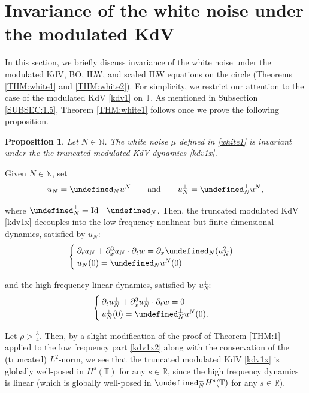 \documentclass[letterpaper, 11pt,  reqno]{amsart}
\newtheorem{proposition}[theorem]{Proposition}
\DeclareMathOperator{\Id}{Id}
\newcommand{\1}{\hspace{0.5mm}\text{I}\hspace{0.5mm}}
\newcommand{\noi}{\noindent}
\newcommand{\R}{\mathbb{R}}
\newcommand{\T}{\mathbb{T}}
\let\P= \undefined
\newcommand{\P}{\mathbf{P}}
\newcommand{\dx}{\partial_x}
\newcommand{\dt}{\partial_t}
\newcommand{\N}{\mathbb{N}}
\numberwithin{equation}{section}
\numberwithin{theorem}{section}
\begin{document}
\section{Invariance of the white noise under the modulated KdV}
\label{SEC:WN}



In this section, we briefly discuss 
invariance of the white noise under
the modulated KdV, BO, ILW, and scaled ILW equations on the circle
(Theorems \ref{THM:white1} and \ref{THM:white2}).
For simplicity, we restrict our attention to the case
of the modulated KdV \eqref{kdv1} on $\T$.
As mentioned in Subsection \ref{SUBSEC:1.5}, 
Theorem \ref{THM:white1} follows once we prove the following proposition.


\begin{proposition}\label{PROP:white2}
Let $N \in \N$. The white noise $\mu$ defined in \eqref{white1}
is invariant under the 
the truncated modulated KdV dynamics \eqref{kdv1x}.
\end{proposition}





Given $N \in \N$, 
set
\begin{align*}
u_N = \P_N u^N\qquad \text{and}\qquad
u_N^\perp = \P_N^\perp u^N, 
\end{align*}

\noi
where  $\P_N^\perp = \Id - \P_N$.
Then, the truncated modulated KdV \eqref{kdv1x}
decouples into the low frequency nonlinear but finite-dimensional dynamics, 
satisfied by $u_N$:
\begin{equation}
\begin{cases}
\dt u_N+  \dx^3 u_N \cdot \dt w =\dx \P_N(u_N^2) \\
u_N(0) = \P_N u^N(0)
\end{cases}
\label{kdv1x2}
\end{equation}



\noi
and the high frequency linear dynamics, 
satisfied by $u_N^\perp$:
\begin{equation}
\begin{cases}
\dt u_N^\perp+  \dx^3 u_N^\perp \cdot \dt w = 0 \\
u_N^\perp(0) = \P_N^\perp u^N(0).
\end{cases}
\label{kdv1x3}
\end{equation}




\noi
Let $\rho > \frac 34$.
Then, by a slight modification of the proof of Theorem \ref{THM:1}
applied to the low frequency part \eqref{kdv1x2}
along with the conservation of the (truncated) $L^2$-norm, 
we see that 
the truncated modulated KdV \eqref{kdv1x}
is globally well-posed in $H^s(\T)$ for any $s \in \R$,
since the high frequency dynamics is linear
(which is globally well-posed in $\P_N^\perp H^s(\T)$ for any $s \in \R$).
\end{document}
